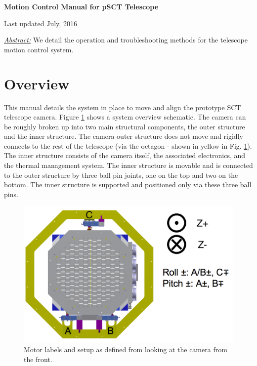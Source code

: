 \documentclass[11pt]{article}
\begin{document}
\begin{center}
{\bf{\huge{Motion Control Manual for pSCT Telescope}}}

\vspace{0.1in}
Last updated July, 2016

\vspace{0.3in}
{\it{\underline{Abstract:}}} We detail the operation and troubleshooting methods for the telescope motion control system.

\end{center}

\tableofcontents

\vspace{0.2in}


\section{Overview}

This manual details the system in place to move and align the prototype SCT telescope camera.
Figure \ref{FigWhole} shows a system overview schematic.
The camera can be roughly broken up into two main structural components, the outer structure and the inner structure.
The camera outer structure does not move and rigidly connects to the rest of the telescope (via the octagon - shown in yellow in Fig. \ref{FigWhole}).
The inner structure consists of the camera itself, the associated electronics, and the thermal management system.
The inner structure is movable and is connected to the outer structure by three ball pin joints, one on the top and two on the bottom.
The inner structure is supported and positioned only via these three ball pins.


\begin{figure}[h]
\begin{center}
\includegraphics[width = 4.5in]{camerapicNew.png}
\caption{Motor labels and setup as defined from looking at the camera from the front.}  
\label{FigWhole}
\end{center}
\end{figure}
\end{document}

